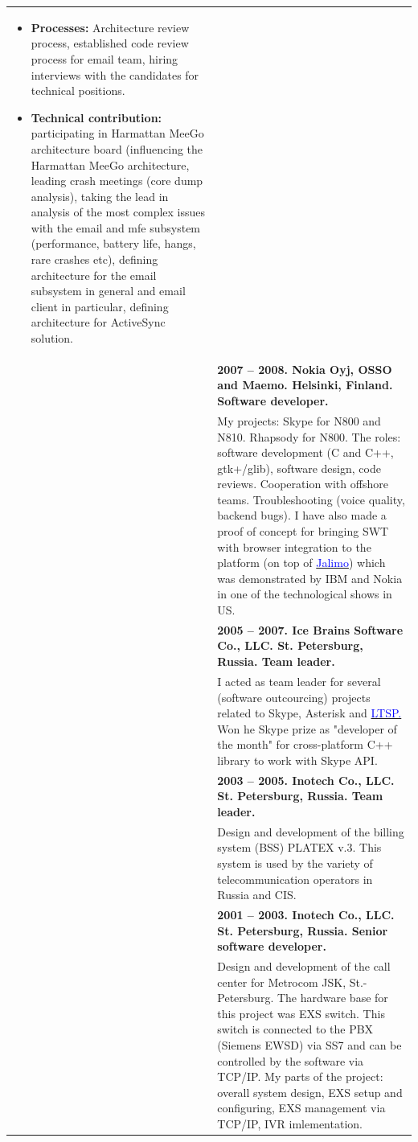 \documentclass[a4paper]{article}
\newcommand{\myhref}[2]{\href{#1}{\textcolor{blue}{#2}}}
\begin{document}
\begin{tabular}{lp{12cm}}
\begin{itemize}
\item \textbf{Processes:} Architecture review process, established code review process for email team, hiring interviews with the candidates for technical positions.
\item \textbf{Technical contribution:} participating in Harmattan MeeGo architecture board (influencing the Harmattan
MeeGo architecture, leading crash meetings (core dump analysis), taking the lead in analysis of the most complex
issues with the email and mfe subsystem (performance, battery life, hangs, rare crashes etc), defining architecture for the email subsystem in
general and email client in particular, defining architecture for ActiveSync solution.
\end{itemize}\\[-.25cm]
& \textbf{2007 -- 2008. Nokia Oyj, OSSO and Maemo. Helsinki, Finland. Software developer.}\\
& My projects: Skype for N800 and N810. Rhapsody for N800. The roles: software development (C and C++, gtk+/glib),
software design, code reviews.  Cooperation with offshore teams. Troubleshooting (voice quality, backend bugs).
I have also made a proof of concept for bringing SWT with browser integration to the platform (on top of
\myhref{https://evolvis.org/plugins/mediawiki/wiki/jalimo/index.php/Jalimo}{Jalimo}) which was demonstrated by IBM and Nokia
in one of the technological shows in US.\\
& \textbf{2005 -- 2007. Ice Brains Software Co., LLC. St. Petersburg, Russia.  Team leader.}\\
& I acted as team leader for several (software outcourcing) projects related to Skype, Asterisk and \myhref{http://www.ltsp.org/}{LTSP.} Won he Skype prize as "developer of the month" for cross-platform C++ library to work with Skype API.\\
& \textbf{2003 -- 2005. Inotech Co., LLC. St. Petersburg, Russia. Team leader.}\\
& Design and development of the billing system (BSS) PLATEX v.3.  This system is used by the variety of telecommunication operators in Russia and CIS.\\
& \textbf{2001 -- 2003. Inotech Co., LLC. St. Petersburg, Russia.  Senior software developer.}\\
& Design and development of the call center for Metrocom JSK, St.-Petersburg.  
The hardware base for this project was EXS switch.  This switch is connected to the PBX (Siemens EWSD) via SS7 and can be controlled
by the software via TCP/IP. My parts of the project: overall system design, EXS setup and configuring, EXS management via TCP/IP, IVR imlementation.\\
\end{tabular}
\end{document}
